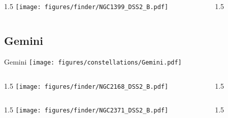 \documentclass[final]{beamer}
\newlength{\colwidth}
\begin{document}

\begin{frame}[t]{}
  \begin{columns}[T]
    \begin{column}{1.5\colwidth}
      \centering
      \texttt{[image: figures/finder/NGC1399\_DSS2\_B.pdf]}
    \end{column}
    \begin{column}{1.5\colwidth}
      \Large
      
    \end{column}
  \end{columns}
  \vspace{\fill}
\end{frame}

\subsection{Gemini}

\begin{frame}[t]{\LARGE Gemini}
  \centering
  \texttt{[image: figures/constellations/Gemini.pdf]}
\end{frame}


\begin{frame}[t]{}
  \begin{columns}[T]
    \begin{column}{1.5\colwidth}
      \centering
      \texttt{[image: figures/finder/NGC2168\_DSS2\_B.pdf]}
    \end{column}
    \begin{column}{1.5\colwidth}
      \Large
      
    \end{column}
  \end{columns}
  \vspace{\fill}
  \begin{columns}[T]
    \begin{column}{1.5\colwidth}
      \centering
      \texttt{[image: figures/finder/NGC2371\_DSS2\_B.pdf]}
    \end{column}
    \begin{column}{1.5\colwidth}
      \Large
      
    \end{column}
  \end{columns}
\end{frame}
\end{document}
